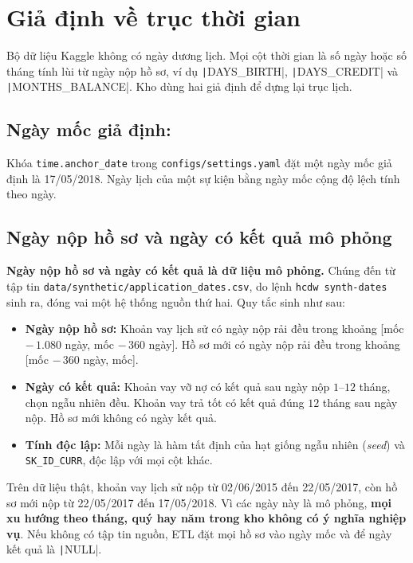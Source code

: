 \section{Giả định về trục thời gian}
\label{sec:time}
Bộ dữ liệu Kaggle không có ngày dương lịch. Mọi cột thời gian là số ngày hoặc số tháng tính lùi từ ngày nộp hồ sơ, ví dụ \texttt|DAYS_BIRTH|, \texttt|DAYS_CREDIT| và \texttt|MONTHS_BALANCE|. Kho dùng hai giả định để dựng lại trục lịch.

\subsection*{Ngày mốc giả định:} Khóa \texttt{time.anchor\_date} trong \texttt{configs/settings.yaml} đặt một ngày mốc giả định là 17/05/2018. Ngày lịch của một sự kiện bằng ngày mốc cộng độ lệch tính theo ngày.

\subsection{Ngày nộp hồ sơ và ngày có kết quả mô phỏng}
\textbf{Ngày nộp hồ sơ và ngày có kết quả là dữ liệu mô phỏng.} Chúng đến từ tập tin \texttt{data/synthetic/application\_dates.csv}, do lệnh \texttt{hcdw synth-dates} sinh ra, đóng vai một hệ thống nguồn thứ hai. Quy tắc sinh như sau:
\begin{itemize}[topsep=0pt, itemsep=1pt]
	\item \textbf{Ngày nộp hồ sơ:} Khoản vay lịch sử có ngày nộp rải đều trong khoảng [mốc $-\,1.080$ ngày, mốc $-\,360$ ngày]. Hồ sơ mới có ngày nộp rải đều trong khoảng [mốc $-\,360$ ngày, mốc].
	\item \textbf{Ngày có kết quả:} Khoản vay vỡ nợ có kết quả sau ngày nộp $1$--$12$ tháng, chọn ngẫu nhiên đều. Khoản vay trả tốt có kết quả đúng $12$ tháng sau ngày nộp. Hồ sơ mới không có ngày kết quả.
	\item \textbf{Tính độc lập:} Mỗi ngày là hàm tất định của hạt giống ngẫu nhiên (\textit{seed}) và \texttt{SK\_ID\_CURR}, độc lập với mọi cột khác.
\end{itemize}

Trên dữ liệu thật, khoản vay lịch sử nộp từ 02/06/2015 đến 22/05/2017, còn hồ sơ mới nộp từ 22/05/2017 đến 17/05/2018. Vì các ngày này là mô phỏng, \textbf{mọi xu hướng theo tháng, quý hay năm trong kho không có ý nghĩa nghiệp vụ}. Nếu không có tập tin nguồn, ETL đặt mọi hồ sơ vào ngày mốc và để ngày kết quả là \texttt|NULL|.

